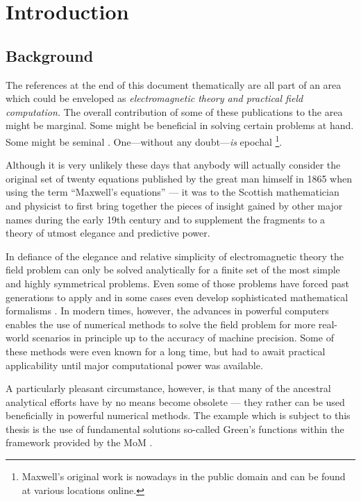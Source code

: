 \chapter{Introduction}
\label{ch:introduction}






\section{Background}

The references at the end of this document thematically are all part of an area
which could be enveloped as \emph{electromagnetic theory and practical field
computation.}
The overall contribution of some of these publications to the area might be
marginal.
Some might be beneficial in solving certain problems at hand.
Some might be seminal \cite{Sommerfeld1909}.
One---without any doubt---\emph{is} epochal
\cite{maxwell1865}\footnote{Maxwell's original work \cite{maxwell1865} is
nowadays in the public domain and can be found at various
locations online.}.

Although it is very unlikely these days that anybody will actually consider the
original set of twenty equations published by the great man himself in 1865
\cite{maxwell1865} when using the term \enquote{Maxwell's equations} ---
it was to the Scottish mathematician and physicist to first bring together the
pieces of insight gained by other major names during the early 19th century and
to supplement the fragments to a theory of utmost elegance and predictive power.

In defiance of the elegance and relative simplicity of electromagnetic theory
the field problem can only be solved analytically for a finite set of the most
simple and highly symmetrical problems.
Even some of those problems have forced past generations to apply and in some
cases even develop sophisticated mathematical formalisms \cite{Felsen1994}.
In modern times, however, the advances in powerful computers enables the use of  
numerical methods to solve the field problem for more real-world scenarios in
principle up to the accuracy of machine precision.
Some of these methods were even known for a long time, but had to await
practical applicability until major computational power was available.

A particularly pleasant circumstance, however, is that many of the ancestral
analytical efforts have by no means become obsolete --- they rather can be used
beneficially in powerful numerical methods.
The example which is subject to this thesis is the use of fundamental solutions
\textemdash so-called Green's functions \textemdash within the framework
provided by the \ac{MoM} \cite{Harrington1993}.

